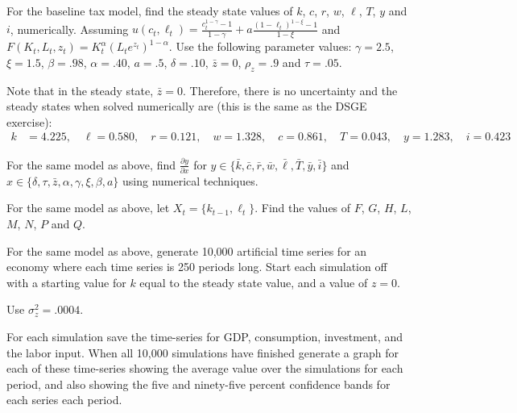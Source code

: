 \documentclass[letterpaper,11pt]{article}
\theoremstyle{definition}
\begin{document}
\begin{spacing}{1.5}
	\begin{Exercise} \label{Linear_HW_Base_Numer_SS}
		For the baseline tax model, find the steady state values of $k$, $c$, $r$, $w$, $\ell$, $T$, $y$ and $i$, numerically.  Assuming $u(c_t,\ell_t) = \frac{c^{1-\gamma}_t -1}{1-\gamma}+ a \frac{(1-\ell_t)^{1-\xi}-1}{1-\xi}$ and $F(K_t,L_t,z_t) = K^{\alpha}_t (L_te^{z_t})^{1-\alpha} $.  Use the following parameter values: $\gamma = 2.5$, $\xi = 1.5$,  $\beta = .98$, $\alpha = .40$, $a=.5$, $\delta = .10$, $\bar z = 0$, $\rho_z=.9$ and $\tau = .05$.
	\end{Exercise}

	Note that in the steady state, $\bar{z} = 0$. Therefore, there is no uncertainty and the steady states when solved numerically are (this is the same as the DSGE exercise):
	\begin{align*}
		k&=4.225, \quad \ell= 0.580, \quad r= 0.121, \quad w=1.328, \quad c=0.861, \quad T=0.043, \quad y=1.283, \quad i=0.423
	\end{align*}

	\begin{Exercise} \label{Linear_HW_Base_Numer_Deriv}
		For the same model as above, find $\frac{\partial y}{\partial x}$ for $y\in\{\bar k, \bar c, \bar r, \bar w, \bar \ell, \bar T, \bar y, \bar i\}$ and $x\in\{\delta, \tau, \bar z, \alpha, \gamma, \xi, \beta, a \}$ using numerical techniques.
	\end{Exercise}



	\begin{Exercise} \label{Linear_HW_Base_Coeffs}
		For the same model as above, let $X_t = \{k_{t-1}, \ell_t\}$.  Find the values of $F$, $G$, $H$, $L$, $M$, $N$, $P$ and $Q$.
	\end{Exercise}

	\begin{Exercise} \label{Linear_HW_Base_Sims}
		For the same model as above, generate 10,000 artificial time series for an economy where each time series is 250 periods long.  Start each simulation off with a starting value for $k$ equal to the steady state value, and a value of $z=0$.

		Use $\sigma_z^2 = .0004$.

		For each simulation save the time-series for GDP, consumption, investment, and the labor input.  When all 10,000 simulations have finished generate a graph for each of these time-series showing the average value over the simulations for each period, and also showing the five and ninety-five percent confidence bands for each series each period.
	\end{Exercise}


\end{spacing}
\end{document}
